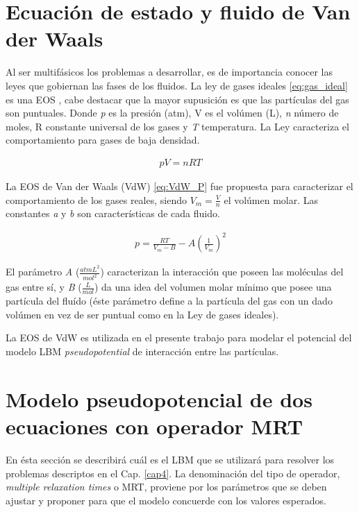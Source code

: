 \section{Ecuación de estado y fluido de Van der Waals}

Al ser multifásicos los problemas a desarrollar, es de importancia conocer las leyes que gobiernan las fases de los fluidos. La ley de gases ideales \ref{eq:gas_ideal} es una EOS , cabe destacar que la mayor supusición es que las partículas del gas son puntuales. Donde \textit{p} es la presión (atm), V es el volúmen (L), \textit{n} número de moles, R constante universal de los gases y \textit{T} temperatura. La Ley caracteriza el comportamiento para gases de baja densidad.

\begin{align}
p V = n R T
\label{eq:gas_ideal}
\end{align}

La EOS de Van der Waals (VdW) \ref{eq:VdW_P} fue propuesta para caracterizar el comportamiento de los gases reales, siendo $V_m = \frac{V}{n}$ el volúmen molar. Las constantes \textit{a} y \textit{b} son características de cada fluido.

\begin{align}
p = \frac{R T}{V_m - B} - A {(\frac{1}{V_m})}^2
\label{eq:VdW_P}
\end{align}

El parámetro \textit{A}  ($\frac{atm L^2}{mol^2}$) caracterizan la interacción que poseen las moléculas del gas entre sí, y \textit{B} ($\frac{L}{mol}$) da una idea del volumen molar mínimo que posee una partícula del fluído (éste parámetro define a la partícula del gas con un dado volúmen en vez de ser puntual como en la Ley de gases ideales).

La EOS de VdW es utilizada en el presente trabajo para modelar el potencial del modelo LBM \textit{pseudopotential} de interacción entre las partículas.


\section{Modelo pseudopotencial de dos ecuaciones con operador MRT}
\label{sec:LBM_2_ec_MRT}

En ésta sección se describirá cuál es el LBM que se utilizará para resolver los problemas descriptos en el Cap. \ref{cap4}. La denominación del tipo de operador, \textit{multiple relaxation times} o MRT, proviene por los parámetros que se deben ajustar y proponer para que el modelo concuerde con los valores esperados.

